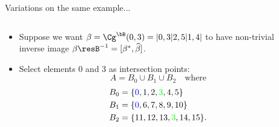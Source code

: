 \documentclass[xcolor=dvipsnames,9pt,hide notes]{beamer}
\begin{document}
\begin{frame}[fragile,label=OAEx2,shrink=5]{Variations on the same example... }

  \begin{columns}
    \begin{column}{0.7\textwidth}
      \begin{itemize}
      \item 
        Suppose we want $\beta = \Cg^\bB(0,3) =| 0, 3 | 2, 5 | 1, 4 |$ to 
        \vskip4pt
        have non-trivial inverse image $\beta\resB^{-1} = [\beta^*, \widehat{\beta}]$.  
        \vskip6pt
      \item<2-> Select elements 0 and 3 as intersection points:
        \[
        A = B_0 \cup B_1 \cup B_2 \quad \text{where}
        \]
        \begin{align*}
          B_0 &= \{{\color{blue} 0}, 1,  2,  {\color{green}3},  4,  5\}\\
          B_1 &= \{{\color{blue} 0}, 6,  7,  8,  9, 10\}\\
          B_2 &= \{11, 12, 13, {\color{green}3}, 14, 15\}.
        \end{align*}
      \end{itemize}
    \end{column}
    \begin{column}{0.3\textwidth}

    \end{column}

  \end{columns}

  \vskip-5mm

  \begin{columns}
    \begin{column}{0.3\textwidth}

\end{column}
\end{columns}
\end{frame}
\end{document}
